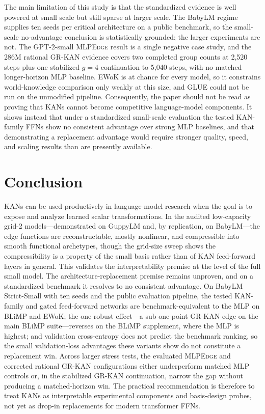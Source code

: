 \documentclass[11pt]{article}
\newcommand{\modelname}[1]{\textsc{#1}}
\newcommand{\grkan}{\modelname{GR-KAN}}
\newcommand{\mlpedge}{\modelname{MLPEdge}}
\begin{document}
The main limitation of this study is that the standardized evidence is well powered at small scale but still sparse at larger scale. The BabyLM regime supplies ten seeds per critical architecture on a public benchmark, so the small-scale no-advantage conclusion is statistically grounded; the larger experiments are not. The GPT-2-small \mlpedge{} result is a single negative case study, and the 286M rational \grkan{} evidence covers two completed group counts at 2,520 steps plus one stabilized \(g=4\) continuation to 5,040 steps, with no matched longer-horizon MLP baseline. EWoK is at chance for every model, so it constrains world-knowledge comparison only weakly at this size, and GLUE could not be run on the unmodified pipeline. Consequently, the paper should not be read as proving that KANs cannot become competitive language-model components. It shows instead that under a standardized small-scale evaluation the tested KAN-family FFNs show no consistent advantage over strong MLP baselines, and that demonstrating a replacement advantage would require stronger quality, speed, and scaling results than are presently available.

\section{Conclusion}

KANs can be used productively in language-model research when the goal is to expose and analyze learned scalar transformations. In the audited low-capacity grid-2 models---demonstrated on GuppyLM and, by replication, on BabyLM---the edge functions are reconstructable, mostly nonlinear, and compressible into smooth functional archetypes, though the grid-size sweep shows the compressibility is a property of the small basis rather than of KAN feed-forward layers in general. This validates the interpretability premise at the level of the full small model. The architecture-replacement premise remains unproven, and on a standardized benchmark it resolves to no consistent advantage. On BabyLM Strict-Small with ten seeds and the public evaluation pipeline, the tested KAN-family and gated feed-forward networks are benchmark-equivalent to the MLP on BLiMP and EWoK; the one robust effect---a sub-one-point \grkan{} edge on the main BLiMP suite---reverses on the BLiMP supplement, where the MLP is highest; and validation cross-entropy does not predict the benchmark ranking, so the small validation-loss advantages these variants show do not constitute a replacement win. Across larger stress tests, the evaluated \mlpedge{} and corrected rational \grkan{} configurations either underperform matched MLP controls or, in the stabilized \grkan{} continuation, narrow the gap without producing a matched-horizon win. The practical recommendation is therefore to treat KANs as interpretable experimental components and basis-design probes, not yet as drop-in replacements for modern transformer FFNs.
\end{document}
